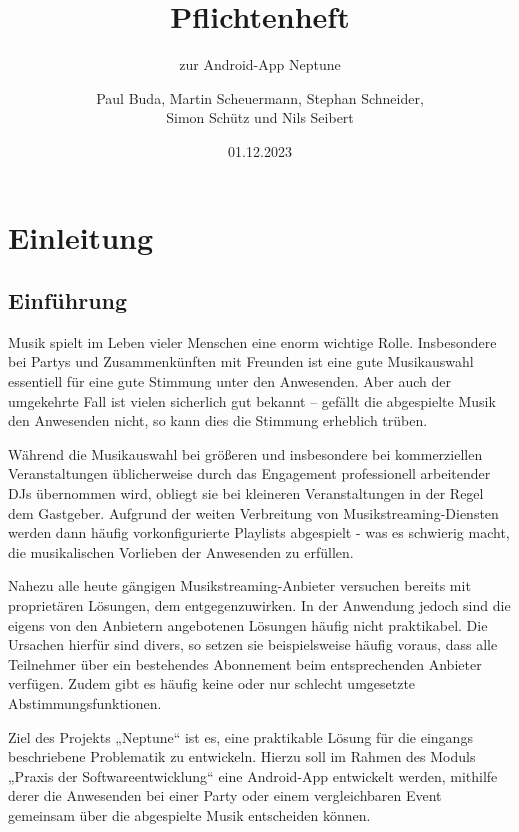 \documentclass[oneside, ngerman]{sdqtechreport}
\author{Paul Buda, Martin Scheuermann, Stephan Schneider, \\
Simon Schütz und Nils Seibert}
\title{Pflichtenheft}
\subtitle{zur Android-App Neptune}
\date{01.12.2023}
\begin{document}
\setpdf

\maketitle

\tableofcontents

\cleardoublepage


\chapter{Einleitung}
\label{chap:Einleitung}

\section{Einführung}
\label{sec:Einleitung:Einführung}
Musik spielt im Leben vieler Menschen eine enorm wichtige Rolle. Insbesondere bei Partys und Zusammenkünften mit Freunden ist eine gute Musikauswahl essentiell für eine gute Stimmung unter den Anwesenden. Aber auch der umgekehrte Fall ist vielen sicherlich gut bekannt – gefällt die abgespielte Musik den Anwesenden nicht, so kann dies die Stimmung erheblich trüben.

Während die Musikauswahl bei größeren und insbesondere bei kommerziellen Veranstaltungen üblicherweise durch das Engagement professionell arbeitender DJs übernommen wird, obliegt sie bei kleineren Veranstaltungen in der Regel dem Gastgeber. Aufgrund der weiten Verbreitung von Musikstreaming-Diensten werden dann häufig vorkonfigurierte Playlists abgespielt - was es schwierig macht, die musikalischen Vorlieben der Anwesenden zu erfüllen.

Nahezu alle heute gängigen Musikstreaming-Anbieter versuchen bereits mit proprietären Lösungen, dem entgegenzuwirken. In der Anwendung jedoch sind die eigens von den Anbietern angebotenen Lösungen häufig nicht praktikabel. Die Ursachen hierfür sind divers, so setzen sie beispielsweise häufig voraus, dass alle Teilnehmer über ein bestehendes Abonnement beim entsprechenden Anbieter verfügen. Zudem gibt es häufig keine oder nur schlecht umgesetzte Abstimmungsfunktionen.

Ziel des Projekts „Neptune“ ist es, eine praktikable Lösung für die eingangs beschriebene Problematik zu entwickeln. Hierzu soll im Rahmen des Moduls „Praxis der Softwareentwicklung“ eine Android-App entwickelt werden, mithilfe derer die Anwesenden bei einer Party oder einem vergleichbaren Event gemeinsam über die abgespielte Musik entscheiden können. 
\end{document}
